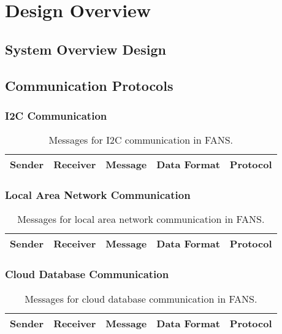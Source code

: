 \section{Design Overview}

\subsection{System Overview Design}

\subsection{Communication Protocols}

\subsubsection{I2C Communication}

\begin{table}[H]
    \centering
    \begin{tabular}{| c | c | c | c | c |}
        \hline
        Sender & Receiver & Message & Data Format & Protocol \\
        \hline
    \end{tabular}
    \caption{Messages for I2C communication in FANS.}
\end{table}

\subsubsection{Local Area Network Communication}

\begin{table}[H]
    \centering
    \begin{tabular}{| c | c | c | c | c |}
        \hline
        Sender & Receiver & Message & Data Format & Protocol \\
        \hline
    \end{tabular}
    \caption{Messages for local area network communication in FANS.}
\end{table}

\subsubsection{Cloud Database Communication}

\begin{table}[H]
    \centering
    \begin{tabular}{| c | c | c | c | c |}
        \hline
        Sender & Receiver & Message & Data Format & Protocol \\
        \hline
    \end{tabular}
    \caption{Messages for cloud database communication in FANS.}
\end{table}

